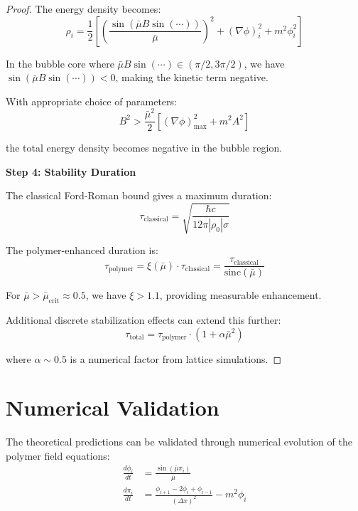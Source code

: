 \documentclass[12pt]{article}
\begin{document}
\begin{proof}
The energy density becomes:
\begin{equation}
\rho_i = \frac{1}{2}\left[ \left(\frac{\sin(\bar{\mu} B \sin(\cdots))}{\bar{\mu}}\right)^2 + (\nabla \phi)_i^2 + m^2 \phi_i^2 \right]
\end{equation}

In the bubble core where $\bar{\mu} B \sin(\cdots) \in (\pi/2, 3\pi/2)$, we have $\sin(\bar{\mu} B \sin(\cdots)) < 0$, making the kinetic term negative.

With appropriate choice of parameters:
\begin{equation}
B^2 > \frac{\bar{\mu}^2}{2}\left[ (\nabla \phi)_{\text{max}}^2 + m^2 A^2 \right]
\end{equation}

the total energy density becomes negative in the bubble region.

\textbf{Step 4: Stability Duration}

The classical Ford-Roman bound gives a maximum duration:
\begin{equation}
\tau_{\text{classical}} = \sqrt{\frac{\hbar c}{12\pi |\rho_0| \sigma}}
\end{equation}

The polymer-enhanced duration is:
\begin{equation}
\tau_{\text{polymer}} = \xi(\bar{\mu}) \cdot \tau_{\text{classical}} = \frac{\tau_{\text{classical}}}{\text{sinc}(\bar{\mu})}
\end{equation}

For $\bar{\mu} > \bar{\mu}_{\text{crit}} \approx 0.5$, we have $\xi > 1.1$, providing measurable enhancement.

Additional discrete stabilization effects can extend this further:
\begin{equation}
\tau_{\text{total}} = \tau_{\text{polymer}} \cdot \left(1 + \alpha \bar{\mu}^2\right)
\end{equation}

where $\alpha \sim 0.5$ is a numerical factor from lattice simulations.
\end{proof}

\section{Numerical Validation}

The theoretical predictions can be validated through numerical evolution of the polymer field equations:
\begin{align}
\frac{d\phi_i}{dt} &= \frac{\sin(\bar{\mu} \pi_i)}{\bar{\mu}} \\
\frac{d\pi_i}{dt} &= \frac{\phi_{i+1} - 2\phi_i + \phi_{i-1}}{(\Delta x)^2} - m^2 \phi_i
\end{align}
\end{document}
